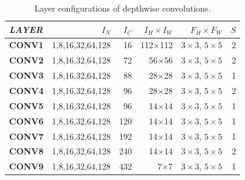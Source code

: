 \begin{table}[]
\caption{Layer configurations of depthwise  convolutions.}
\vspace{-3mm}
\label{tab:depconvconfigs}
\centering
{}
\begin{threeparttable}
\begin{tabular}{lrrrrr}
\toprule
\textbf{\emph{LAYER}}& \textbf{$I_N$} & \textbf{$I_C$} & \textbf{$I_H \times I_W$ }&  \textbf{$F_H \times F_W$} &\textbf{$S$}\\
\midrule
\textbf{CONV1} & 1,8,16,32,64,128  & 16    & 112$\times$112 & $3 \times 3$, $5 \times 5$&2  \\
\textbf{CONV2} & 1,8,16,32,64,128  & 72    & 56$\times$56  &$3 \times 3$, $5 \times 5$  &2 \\
\textbf{CONV3} & 1,8,16,32,64,128  & 88   & 28$\times$28  &$3 \times 3$, $5 \times 5$   &1 \\
\textbf{CONV4} & 1,8,16,32,64,128  & 96    & 28$\times$28  &$3 \times 3$, $5 \times 5$  &2  \\
\textbf{CONV5} & 1,8,16,32,64,128  & 96   & 14$\times$14  &$3 \times 3$, $5 \times 5$   &1 \\
\textbf{CONV6} & 1,8,16,32,64,128  & 120   & 14$\times$14  &$3 \times 3$, $5 \times 5$  &1  \\
\textbf{CONV7} & 1,8,16,32,64,128  & 192   & 14$\times$14  &$3 \times 3$, $5 \times 5$  &1  \\
\textbf{CONV8} & 1,8,16,32,64,128  & 240   & 14$\times$14  &$3 \times 3$, $5 \times 5$  &2  \\
\textbf{CONV9} & 1,8,16,32,64,128  & 432   & 7$\times$7  &$3 \times 3$, $5 \times 5$    &1\\

\bottomrule
\end{tabular}
\end{threeparttable}

\end{table}


